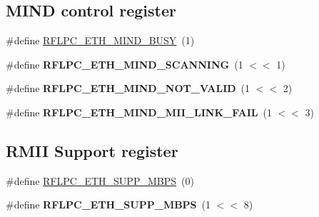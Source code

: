 \subsection*{M\-I\-N\-D control register}
\begin{DoxyCompactItemize}
\item 
\#define \hyperlink{group__eth_gaf92e9f547f9c7308c8bcf182af4f2ad2}{R\-F\-L\-P\-C\-\_\-\-E\-T\-H\-\_\-\-M\-I\-N\-D\-\_\-\-B\-U\-S\-Y}~(1)
\item 
\hypertarget{group__eth_ga7384a0f2972358b8870173aa463904b5}{\#define {\bfseries R\-F\-L\-P\-C\-\_\-\-E\-T\-H\-\_\-\-M\-I\-N\-D\-\_\-\-S\-C\-A\-N\-N\-I\-N\-G}~(1 $<$$<$ 1)}\label{group__eth_ga7384a0f2972358b8870173aa463904b5}

\item 
\hypertarget{group__eth_gad5b75968973d33a31092ee078a1ce6a0}{\#define {\bfseries R\-F\-L\-P\-C\-\_\-\-E\-T\-H\-\_\-\-M\-I\-N\-D\-\_\-\-N\-O\-T\-\_\-\-V\-A\-L\-I\-D}~(1 $<$$<$ 2)}\label{group__eth_gad5b75968973d33a31092ee078a1ce6a0}

\item 
\hypertarget{group__eth_ga490a83de934d2177f16b8ad8c05884ef}{\#define {\bfseries R\-F\-L\-P\-C\-\_\-\-E\-T\-H\-\_\-\-M\-I\-N\-D\-\_\-\-M\-I\-I\-\_\-\-L\-I\-N\-K\-\_\-\-F\-A\-I\-L}~(1 $<$$<$ 3)}\label{group__eth_ga490a83de934d2177f16b8ad8c05884ef}

\end{DoxyCompactItemize}
\subsection*{R\-M\-I\-I Support register}
\begin{DoxyCompactItemize}
\item 
\#define \hyperlink{group__eth_ga8f9f474b102dab60aa02e9f25ee01a26}{R\-F\-L\-P\-C\-\_\-\-E\-T\-H\-\_\-\-S\-U\-P\-P\-\_\-M\-B\-P\-S}~(0)
\item 
\hypertarget{group__eth_gaf596be17249ca2ff3cb1da0b8a75817d}{\#define {\bfseries R\-F\-L\-P\-C\-\_\-\-E\-T\-H\-\_\-\-S\-U\-P\-P\-\_\-M\-B\-P\-S}~(1 $<$$<$ 8)}\label{group__eth_gaf596be17249ca2ff3cb1da0b8a75817d}

\end{DoxyCompactItemize}
